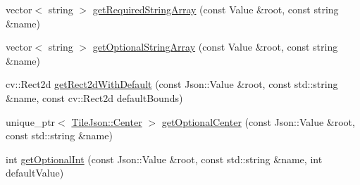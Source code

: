 \begin{DoxyCompactItemize}
\item 
vector$<$ string $>$ \hyperlink{namespacedg_1_1deepcore_1_1imagery_aa683178eb392cf39baede76e51f24d12}{get\+Required\+String\+Array} (const Value \&root, const string \&name)
\item 
vector$<$ string $>$ \hyperlink{namespacedg_1_1deepcore_1_1imagery_aa5871533ad39eff0ac77fc48b10334b4}{get\+Optional\+String\+Array} (const Value \&root, const string \&name)
\item 
cv\+::\+Rect2d \hyperlink{namespacedg_1_1deepcore_1_1imagery_abfb515b942ddd9c5cfd5650dd715ffba}{get\+Rect2d\+With\+Default} (const Json\+::\+Value \&root, const std\+::string \&name, const cv\+::\+Rect2d default\+Bounds)
\item 
unique\+\_\+ptr$<$ \hyperlink{structdg_1_1deepcore_1_1imagery_1_1_tile_json_1_1_center}{Tile\+Json\+::\+Center} $>$ \hyperlink{namespacedg_1_1deepcore_1_1imagery_a051e94f679a198b8567c1ac9ad2a9b8d}{get\+Optional\+Center} (const Json\+::\+Value \&root, const std\+::string \&name)
\item 
int \hyperlink{namespacedg_1_1deepcore_1_1imagery_a7c47c9dcfb39612f43df1ae03eef72c1}{get\+Optional\+Int} (const Json\+::\+Value \&root, const std\+::string \&name, int default\+Value)
\end{DoxyCompactItemize}
